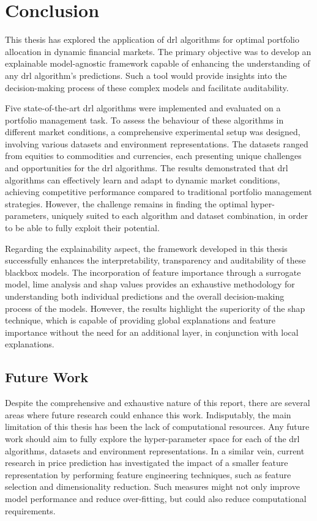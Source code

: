 \chapter{Conclusion} \label{ch:conclusion}

This thesis has explored the application of \acrfull{drl} algorithms for optimal portfolio allocation in dynamic financial markets. The primary objective was to develop an explainable model-agnostic framework capable of enhancing the understanding of any \acrshort{drl} algorithm's predictions. Such a tool would provide insights into the decision-making process of these complex models and facilitate auditability.

Five state-of-the-art \acrshort{drl} algorithms were implemented and evaluated on a portfolio management task. To assess the behaviour of these algorithms in different market conditions, a comprehensive experimental setup was designed, involving various datasets and environment representations. The datasets ranged from equities to commodities and currencies, each presenting unique challenges and opportunities for the \acrshort{drl} algorithms. The results demonstrated that \acrshort{drl} algorithms can effectively learn and adapt to dynamic market conditions, achieving competitive performance compared to traditional portfolio management strategies. However, the challenge remains in finding the optimal hyper-parameters, uniquely suited to each algorithm and dataset combination, in order to be able to fully exploit their potential.

Regarding the explainability aspect, the framework developed in this thesis successfully enhances the interpretability, transparency and auditability of these \gls{blackbox} models. The incorporation of feature importance through a surrogate model, \acrfull{lime} analysis and \acrfull{shap} values provides an exhaustive methodology for understanding both individual predictions and the overall decision-making process of the models. However, the results highlight the superiority of the \acrshort{shap} technique, which is capable of providing global explanations and feature importance without the need for an additional layer, in conjunction with local explanations. 

\section{Future Work} \label{sec:future-work}

Despite the comprehensive and exhaustive nature of this report, there are several areas where future research could enhance this work. Indisputably, the main limitation of this thesis has been the lack of computational resources. Any future work should aim to fully explore the hyper-parameter space for each of the \acrshort{drl} algorithms, datasets and environment representations. In a similar vein, current research in price prediction has investigated the impact of a smaller feature representation by performing feature engineering techniques, such as feature selection and dimensionality reduction. Such measures might not only improve model performance and reduce over-fitting, but could also reduce computational requirements.

